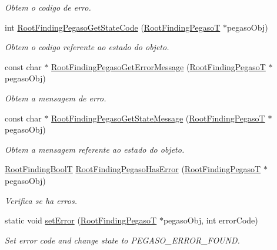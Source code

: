 \begin{CompactItemize}
\begin{CompactList}\small\item\em Obtem o codigo de erro. \item\end{CompactList}\item 
int \hyperlink{group____pegaso_g83892750b865aa977fcdba83922ad6fb}{RootFindingPegasoGetStateCode} (\hyperlink{structRootFindingPegaso}{RootFindingPegasoT} $\ast$pegasoObj)
\begin{CompactList}\small\item\em Obtem o codigo referente ao estado do objeto. \item\end{CompactList}\item 
const char $\ast$ \hyperlink{group____pegaso_g4d0abd516b71e0462de1b22ce896b87a}{RootFindingPegasoGetErrorMessage} (\hyperlink{structRootFindingPegaso}{RootFindingPegasoT} $\ast$pegasoObj)
\begin{CompactList}\small\item\em Obtem a mensagem de erro. \item\end{CompactList}\item 
const char $\ast$ \hyperlink{group____pegaso_g2328683ae067772b11e3127fe800448d}{RootFindingPegasoGetStateMessage} (\hyperlink{structRootFindingPegaso}{RootFindingPegasoT} $\ast$pegasoObj)
\begin{CompactList}\small\item\em Obtem a mensagem referente ao estado do objeto. \item\end{CompactList}\item 
\hyperlink{RootFindingCommon_8h_31228d356f5429fa5ba7f206e4dee12f}{RootFindingBoolT} \hyperlink{group____pegaso_g3159b35cddebb0bdc99b85199fbc847f}{RootFindingPegasoHasError} (\hyperlink{structRootFindingPegaso}{RootFindingPegasoT} $\ast$pegasoObj)
\begin{CompactList}\small\item\em Verifica se ha erros. \item\end{CompactList}\item 
static void \hyperlink{group____pegaso_g755ddb4e92d010ac22e88d32e7fcec6f}{setError} (\hyperlink{structRootFindingPegaso}{RootFindingPegasoT} $\ast$pegasoObj, int errorCode)
\begin{CompactList}\small\item\em Set error code and change state to PEGASO\_\-ERROR\_\-FOUND. \item\end{CompactList}\item 

\end{CompactItemize}
